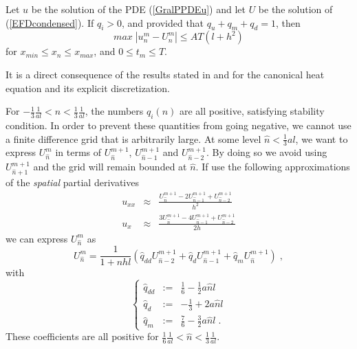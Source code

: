 \begin{lema} Let $u$ be the solution of the PDE (\ref{GralPPDEu}) and
  let $U$ be the solution of (\ref{EFDcondensed}). If $q_i>0$, and
  provided that $q_u + q_m + q_d = 1$, then 
$$
max \; | u^m_n - U^m_n 
  | \leq A T ( l + h^2 )   
$$
for $x_{min} \leq x_n \leq x_{max}$, and $0 \leq t_m \leq T$.
\end{lema}
\begin{demo}
It is a direct consequence of the results stated in \cite[Chap. 2,
pp. 44--45]{A:1977} and \cite[Chap. 2, pp 45--47]{S:1985} for the
canonical heat equation and its explicit discretization.
\end{demo}

For $-\frac{1}{3} \frac{1}{a l} < n < \frac{1}{3} \frac{1}{a l}$, the
numbers $q_i (n)$ are all positive, satisfying stability condition. In
order to prevent these quantities from going negative, we cannot use a
finite difference grid that is arbitrarily large. At some level $\hat{n}
< \frac{1}{3} {a l} $, we want to express $U^m_{\hat{n}}$ in terms of
$U^{m+1}_{\hat{n}}$,  $U^{m+1}_{\hat{n}-1}$ and  $U^{m+1}_{\hat{n}-2}$. By doing
so we avoid using $U^{m+1}_{\hat{n}+1}$ and the grid will remain bounded
at $\hat{n}$. If use the following approximations of the {\sl spatial}
partial derivatives 
\begin{eqnarray}
\nonumber
u_{xx} & \approx & \frac{U^{m+1}_{\hat{n}}- 2 U^{m+1}_{\hat{n}-1} +
  U^{m+1}_{\hat{n}-2}}{h ^2} \\
u_x & \approx & \frac{3 U^{m+1}_{\hat{n}} - 4 U^{m+1}_{\hat{n}-1} +
  U^{m+1}_{\hat{n}-2}}{2h}
\end{eqnarray}
we can express $U^m_{\hat{n}}$ as
\begin{equation}
\label{downEFD}
U^m_{\hat{n}} = \frac{1}{1+ nhl } \left( \hat{q}_{dd} U^{m+1}_{\hat{n}-2}
  + \hat{q}_d U^{m+1}_{\hat{n}-1} + \hat{q}_m U^{m+1}_{\hat{n}} \right)\; , 
\end{equation} 
with 
\begin{equation}
\left\{
\begin{array}{rcl}
\nonumber
\hat{q}_{dd} & := & \frac{1}{6} - \frac{1}{2} a \hat{n} l \\
\nonumber
\hat{q}_d & := & - \frac{1}{3} + 2 a \hat{n} l \\
\nonumber
\hat{q}_m  & := & \frac{7}{6} - \frac{3}{2} a \hat{n} l\; .
\end{array}
\right. 
\end{equation}
These coefficients are all positive for $\frac{1}{6} \frac{1}{a l} <
\hat{n} < \frac{1}{3} \frac{1}{a l}$. 

